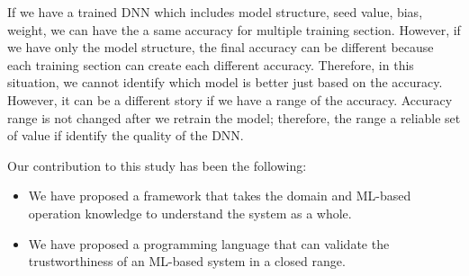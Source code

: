 If we have a trained DNN which includes model structure, seed value, bias, weight, we can have the a same accuracy for multiple training section. However, if we have only the model structure, the final accuracy can be different because each training section can create each different accuracy. Therefore, in this situation, we cannot identify which model is better just based on the accuracy. However, it can be a different story if we have a range of the accuracy. Accuracy range is not changed after we retrain the model; therefore, the range a reliable set of value if identify the quality of the DNN.


Our contribution to this study has been the following:
\begin{itemize}
	\item We have proposed a framework that takes the domain and ML-based operation knowledge to understand the system as a whole.
	\item We have proposed a programming language that can validate the trustworthiness of an ML-based system in a closed range.
\end{itemize}
